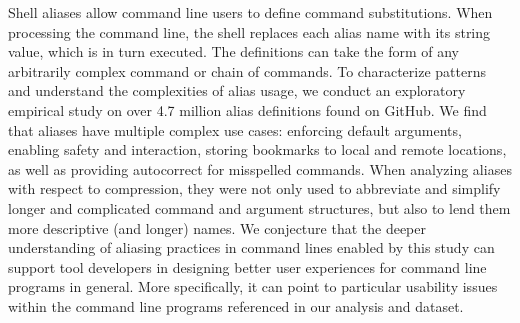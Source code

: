 Shell aliases allow command line users to define command substitutions.
When processing the command line, the shell replaces each alias name with its string value, which is in turn executed.
The definitions can take the form of any arbitrarily complex command or chain of commands.
To characterize patterns and understand the complexities of alias usage, we conduct an exploratory empirical study on over 4.7 million alias definitions found on GitHub.
We find that aliases have multiple complex use cases: enforcing default arguments, enabling safety and interaction, storing bookmarks to local and remote locations, as well as providing autocorrect for misspelled commands.
When analyzing aliases with respect to compression, they were not only used to abbreviate and simplify longer and complicated command and argument structures, but also to lend them more descriptive (and longer) names.
We conjecture that the deeper understanding of aliasing practices in command lines enabled by this study can support tool developers in designing better user experiences for command line programs in general.
More specifically, it can point to particular usability issues within the command line programs referenced in our analysis and dataset.